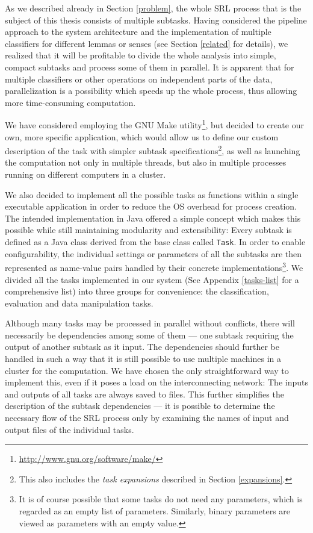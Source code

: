 \documentclass[12pt,notitlepage]{report}
\begin{document}
As we described already in Section \ref{problem}, the whole SRL process that is the subject of this thesis consists of multiple subtasks. Having considered the pipeline approach to the system architecture and the implementation of multiple classifiers for different lemmas or senses (see Section \ref{related} for details), we realized that it will be profitable to divide the whole analysis into simple, compact subtasks and process some of them in parallel. It is apparent that for multiple classifiers or other operations on independent parts of the data, parallelization is a possibility which speeds up the whole process, thus allowing more time-consuming computation. 

We have considered employing the GNU Make utility\footnote{\url{http://www.gnu.org/software/make/}}, but decided to create our own, more specific application, which would allow us to define our custom description of the task with simpler subtask specifications\footnote{This also includes the \emph{task expansions} described in Section \ref{expansions}.}, as well as launching the computation not only in multiple threads, but also in multiple processes running on different computers in a cluster. 

We also decided to implement all the possible tasks as functions within a single executable application in order to reduce the OS overhead for process creation. The intended implementation in Java offered a simple concept which makes this possible while still maintaining modularity and extensibility: Every subtask is defined as a Java class derived from the base class called \texttt{Task}. In order to enable configurability, the individual settings or parameters of all the subtasks are then represented as name-value pairs handled by their concrete implementations\footnote{It is of course possible that some tasks do not need any parameters, which is regarded as an empty list of parameters. Similarly, binary parameters are viewed as parameters with an empty value.}. We divided all the tasks implemented in our system (See Appendix \ref{tasks-list} for a comprehensive list) into three groups for convenience: the classification, evaluation and data manipulation tasks.

Although many tasks may be processed in parallel without conflicts, there will necessarily be dependencies among some of them --- one subtask requiring the output of another subtask as it input. The dependencies should further be handled in such a way that it is still possible to use multiple machines in a cluster for the computation. We have chosen the only straightforward way to implement this, even if it poses a load on the interconnecting network: The inputs and outputs of all tasks are always saved to files. This further simplifies the description of the subtask dependencies --- it is possible to determine the necessary flow of the SRL process only by examining the names of input and output files of the individual tasks.
\end{document}
